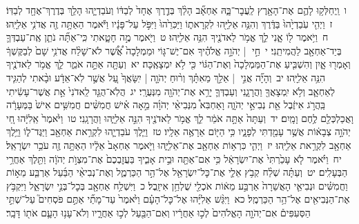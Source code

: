 \documentclass[18pt]{article}
\begin{document}
 {\loc ו~}וַֽיְחַלְּק֥וּ לָהֶ֛ם אֶת־הָאָ֖רֶץ לַֽעֲבׇר־בָּ֑הּ אַחְאָ֞ב הָלַ֨ךְ בְּדֶ֤רֶךְ אֶחָד֙ לְבַדּ֔וֹ וְעֹבַדְיָ֛הוּ הָלַ֥ךְ בְּדֶרֶךְ־אֶחָ֖ד לְבַדּֽוֹ׃ \startlock
 {\loc ז~}וַיְהִ֤י עֹֽבַדְיָ֙הוּ֙ בַּדֶּ֔רֶךְ וְהִנֵּ֥ה אֵלִיָּ֖הוּ לִקְרָאת֑וֹ וַיַּכִּרֵ֙הוּ֙ וַיִּפֹּ֣ל עַל־פָּנָ֔יו וַיֹּ֕אמֶר הַאַתָּ֥ה זֶ֖ה אֲדֹנִ֥י אֵלִיָּֽהוּ׃ \startlock
 {\loc ח~}וַיֹּ֥אמֶר ל֖וֹ אָ֑נִי לֵ֛ךְ אֱמֹ֥ר לַאדֹנֶ֖יךָ הִנֵּ֥ה אֵלִיָּֽהוּ׃ \startlock
 {\loc ט~}וַיֹּ֖אמֶר מֶ֣ה חָטָ֑אתִי כִּֽי־אַתָּ֞ה נֹתֵ֧ן אֶֽת־עַבְדְּךָ֛ בְּיַד־אַחְאָ֖ב לַהֲמִיתֵֽנִי׃ \startlock
 {\loc י~}חַ֣י  |  יְהֹוָ֣ה אֱלֹהֶ֗יךָ אִם־יֶשׁ־גּ֤וֹי וּמַמְלָכָה֙ אֲ֠שֶׁ֠ר לֹא־שָׁלַ֨ח אֲדֹנִ֥י שָׁם֙ לְבַקֶּשְׁךָ֔ וְאָמְר֖וּ אָ֑יִן וְהִשְׁבִּ֤יעַ אֶת־הַמַּמְלָכָה֙ וְאֶת־הַגּ֔וֹי כִּ֖י לֹ֥א יִמְצָאֶֽכָּה׃ \startlock
 {\loc יא~}וְעַתָּ֖ה אַתָּ֣ה אֹמֵ֑ר לֵ֛ךְ אֱמֹ֥ר לַאדֹנֶ֖יךָ הִנֵּ֥ה אֵלִיָּֽהוּ׃ \startlock
 {\loc יב~}וְהָיָ֞ה אֲנִ֣י  |  אֵלֵ֣ךְ מֵאִתָּ֗ךְ וְר֨וּחַ יְהֹוָ֤ה  |  יִֽשָּׂאֲךָ֙ עַ֚ל אֲשֶׁ֣ר לֹֽא־אֵדָ֔ע וּבָ֨אתִי לְהַגִּ֧יד לְאַחְאָ֛ב וְלֹ֥א יִֽמְצָאֲךָ֖ וַהֲרָגָ֑נִי וְעַבְדְּךָ֛ יָרֵ֥א אֶת־יְהֹוָ֖ה מִנְּעֻרָֽי׃ \startlock
 {\loc יג~}הֲלֹֽא־הֻגַּ֤ד לַֽאדֹנִי֙ אֵ֣ת אֲשֶׁר־עָשִׂ֔יתִי בַּֽהֲרֹ֣ג אִיזֶ֔בֶל אֵ֖ת נְבִיאֵ֣י יְהֹוָ֑ה וָאַחְבִּא֩ מִנְּבִיאֵ֨י יְהֹוָ֜ה מֵ֣אָה אִ֗ישׁ חֲמִשִּׁ֨ים חֲמִשִּׁ֥ים אִישׁ֙ בַּמְּעָרָ֔ה וָאֲכַלְכְּלֵ֖ם לֶ֥חֶם וָמָֽיִם׃ \startlock
 {\loc יד~}וְעַתָּה֙ אַתָּ֣ה אֹמֵ֔ר לֵ֛ךְ אֱמֹ֥ר לַאדֹנֶ֖יךָ הִנֵּ֣ה אֵלִיָּ֑הוּ וַהֲרָגָֽנִי׃ \startlock
 {\loc טו~}וַיֹּ֙אמֶר֙ אֵֽלִיָּ֔הוּ חַ֚י יְהֹוָ֣ה צְבָא֔וֹת אֲשֶׁ֥ר עָמַ֖דְתִּי לְפָנָ֑יו כִּ֥י הַיּ֖וֹם אֵרָאֶ֥ה אֵלָֽיו׃ \startlock
 {\loc טז~}וַיֵּ֧לֶךְ עֹבַדְיָ֛הוּ לִקְרַ֥את אַחְאָ֖ב וַיַּגֶּד־ל֑וֹ וַיֵּ֥לֶךְ אַחְאָ֖ב לִקְרַ֥את אֵלִיָּֽהוּ׃ \startlock
 {\loc יז~}וַיְהִ֛י כִּרְא֥וֹת אַחְאָ֖ב אֶת־אֵלִיָּ֑הוּ וַיֹּ֤אמֶר אַחְאָב֙ אֵלָ֔יו הַאַתָּ֥ה זֶ֖ה עֹכֵ֥ר יִשְׂרָאֵֽל׃ \startlock
 {\loc יח~}וַיֹּ֗אמֶר לֹ֤א עָכַ֙רְתִּי֙ אֶת־יִשְׂרָאֵ֔ל כִּ֥י אִם־אַתָּ֖ה וּבֵ֣ית אָבִ֑יךָ בַּעֲזׇבְכֶם֙ אֶת־מִצְוֺ֣ת יְהֹוָ֔ה וַתֵּ֖לֶךְ אַחֲרֵ֥י הַבְּעָלִֽים׃ \startlock
 {\loc יט~}וְעַתָּ֗ה שְׁלַ֨ח קְבֹ֥ץ אֵלַ֛י אֶת־כׇּל־יִשְׂרָאֵ֖ל אֶל־הַ֣ר הַכַּרְמֶ֑ל וְאֶת־נְבִיאֵ֨י הַבַּ֜עַל אַרְבַּ֧ע מֵא֣וֹת וַחֲמִשִּׁ֗ים וּנְבִיאֵ֤י הָאֲשֵׁרָה֙ אַרְבַּ֣ע מֵא֔וֹת אֹכְלֵ֖י שֻׁלְחַ֥ן אִיזָֽבֶל׃ \startlock
 {\loc כ~}וַיִּשְׁלַ֥ח אַחְאָ֖ב בְּכׇל־בְּנֵ֣י יִשְׂרָאֵ֑ל וַיִּקְבֹּ֥ץ אֶת־הַנְּבִיאִ֖ים אֶל־הַ֥ר הַכַּרְמֶֽל׃ \startlock
 {\loc כא~}וַיִּגַּ֨שׁ אֵלִיָּ֜הוּ אֶל־כׇּל־הָעָ֗ם וַיֹּ֙אמֶר֙ עַד־מָתַ֞י אַתֶּ֣ם פֹּסְחִים֮ עַל־שְׁתֵּ֣י הַסְּעִפִּים֒ אִם־יְהֹוָ֤ה הָאֱלֹהִים֙ לְכ֣וּ אַחֲרָ֔יו וְאִם־הַבַּ֖עַל לְכ֣וּ אַחֲרָ֑יו וְלֹא־עָנ֥וּ הָעָ֛ם אֹת֖וֹ דָּבָֽר׃ \startlock
\end{document}
